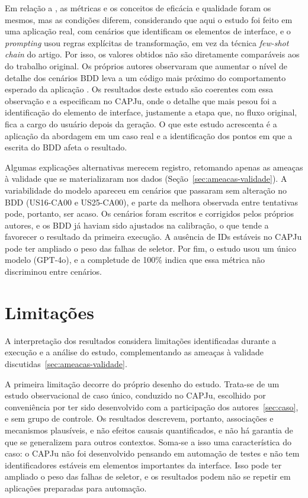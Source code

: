 Em relação a , as métricas e os conceitos de eficácia e qualidade foram os mesmos, mas as condições diferem, considerando que aqui o estudo foi feito em uma aplicação real, com cenários que identificam os elementos de interface, e o \textit{prompting} usou regras explícitas de transformação, em vez da técnica \textit{few-shot chain} do artigo. Por isso, os valores obtidos não são diretamente comparáveis aos do trabalho original. Os próprios autores observaram que aumentar o nível de detalhe dos cenários BDD leva a um código mais próximo do comportamento esperado da aplicação \cite[p.~3226]{Nettur2025}. Os resultados deste estudo são coerentes com essa observação e a especificam no CAPJu, onde o detalhe que mais pesou foi a identificação do elemento de interface, justamente a etapa que, no fluxo original, fica a cargo do usuário depois da geração. O que este estudo acrescenta é a aplicação da abordagem em um caso real e a identificação dos pontos em que a escrita do BDD afeta o resultado.

Algumas explicações alternativas merecem registro, retomando apenas as ameaças à validade que se materializaram nos dados (Seção~\ref{sec:ameacas-validade}). A variabilidade do modelo apareceu em cenários que passaram sem alteração no BDD (US16-CA00 e US25-CA00), e parte da melhora observada entre tentativas pode, portanto, ser acaso. Os cenários foram escritos e corrigidos pelos próprios autores, e os BDD já haviam sido ajustados na calibração, o que tende a favorecer o resultado da primeira execução. A ausência de IDs estáveis no CAPJu pode ter ampliado o peso das falhas de seletor. Por fim, o estudo usou um único modelo (GPT-4o), e a completude de 100\% indica que essa métrica não discriminou entre cenários.

\section{Limitações}
\label{sec:limitacoes}

A interpretação dos resultados considera limitações identificadas durante a execução e a análise do estudo, complementando as ameaças à validade discutidas~\ref{sec:ameacas-validade}.

A primeira limitação decorre do próprio desenho do estudo. Trata-se de um estudo observacional de caso único, conduzido no CAPJu, escolhido por conveniência por ter sido desenvolvido com a participação dos autores~\ref{sec:caso}, e sem grupo de controle. Os resultados descrevem, portanto, associações e mecanismos plausíveis, e não efeitos causais quantificados, e não há garantia de que se generalizem para outros contextos. Soma-se a isso uma característica do caso: o CAPJu não foi desenvolvido pensando em automação de testes e não tem identificadores estáveis em elementos importantes da interface. Isso pode ter ampliado o peso das falhas de seletor, e os resultados podem não se repetir em aplicações preparadas para automação.

